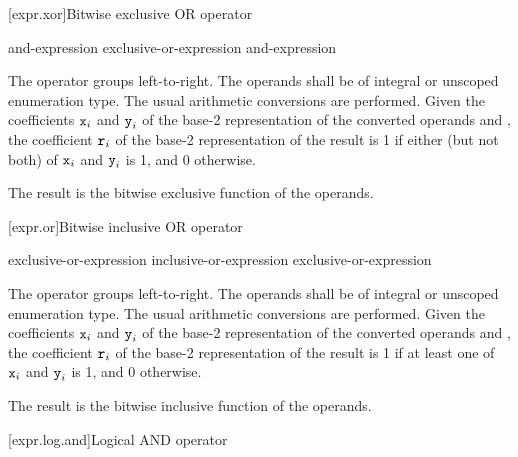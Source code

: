 [expr.xor]{Bitwise exclusive OR operator}%
%
%

\begin{bnf}
\br
    and-expression\br
    exclusive-or-expression \terminal{\caret} and-expression
\end{bnf}

\pnum
The \tcode{\caret} operator groups left-to-right.
The operands shall be of integral or unscoped enumeration type.
The usual arithmetic conversions are performed.
Given the coefficients $\tcode{x}_i$ and $\tcode{y}_i$
of the base-2 representation
of the converted operands  and ,
the coefficient $\tcode{r}_i$
of the base-2 representation of the result 
is 1 if either (but not both) of $\tcode{x}_i$ and $\tcode{y}_i$ is 1,
and 0 otherwise.
\begin{note}
The result is the bitwise exclusive  function of the operands.
\end{note}

[expr.or]{Bitwise inclusive OR operator}%
%
%

\begin{bnf}
\br
    exclusive-or-expression\br
    inclusive-or-expression \terminal{|} exclusive-or-expression
\end{bnf}

\pnum
The \tcode{|} operator groups left-to-right.
The operands shall be of integral or unscoped enumeration type.
The usual arithmetic conversions are performed.
Given the coefficients $\tcode{x}_i$ and $\tcode{y}_i$
of the base-2 representation
of the converted operands  and ,
the coefficient $\tcode{r}_i$
of the base-2 representation of the result 
is 1 if at least one of $\tcode{x}_i$ and $\tcode{y}_i$ is 1, and 0 otherwise.
\begin{note}
The result is the bitwise inclusive  function of the operands.
\end{note}

[expr.log.and]{Logical AND operator}%
%
%
%

